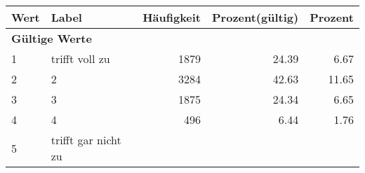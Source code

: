      \begin{longtable}{lXrrr}
     \toprule
     \textbf{Wert} & \textbf{Label} & \textbf{Häufigkeit} & \textbf{Prozent(gültig)} & \textbf{Prozent} \\
     \endhead
     \midrule
     \multicolumn{5}{l}{\textbf{Gültige Werte}}\\

     1 &
     \multicolumn{1}{X}{ trifft voll zu   } &


       \num{1879} &
       \num[round-mode=places,round-precision=2]{24,39} &
         \num[round-mode=places,round-precision=2]{6,67} \\

     2 &
     \multicolumn{1}{X}{ 2   } &


       \num{3284} &
       \num[round-mode=places,round-precision=2]{42,63} &
         \num[round-mode=places,round-precision=2]{11,65} \\

     3 &
     \multicolumn{1}{X}{ 3   } &


       \num{1875} &
       \num[round-mode=places,round-precision=2]{24,34} &
         \num[round-mode=places,round-precision=2]{6,65} \\

     4 &
     \multicolumn{1}{X}{ 4   } &


       \num{496} &
       \num[round-mode=places,round-precision=2]{6,44} &
         \num[round-mode=places,round-precision=2]{1,76} \\

     5 &
     \multicolumn{1}{X}{ trifft gar nicht zu   } &



\end{longtable}
